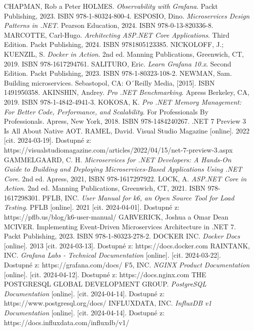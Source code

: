 \documentclass[a4paper,12pt]{article}
\begin{document}
{CHAPMAN, Rob a Peter HOLMES. \emph{Observability with Grafana}. Packt Publishing, 2023. ISBN 978-1-80324-800-4.
ESPOSIO, Dino. \emph{Microservices Design Patterns in .NET}. Pearson Education, 2024. ISBN 978-0-13-820336-8.
MARCOTTE, Carl-Hugo. \emph{Architecting ASP.NET Core Applications}. Third Edition. Packt Publishing, 2024. ISBN 9781805123385.
NICKOLOFF, J.; KUENZIL, S. \emph{Docker in Action}. 2nd ed. Manning Publications, Greenwich, CT, 2019. ISBN 978-1617294761.
SALITURO, Eric. \emph{Learn Grafana 10.x}. Second Edition. Packt Publishing, 2023. ISBN 978-1-80323-108-2.
NEWMAN, Sam. Building microservices. Sebastopol, CA: O´Reilly Media, [2015]. ISBN 1491950358.
AKINSHIN, Andrey. \emph{Pro .NET Benchmarking}. Apress Berkeley, CA, 2019. ISBN 978-1-4842-4941-3.
KOKOSA, K. \emph{Pro .NET Memory Management: For Better Code, Performance, and Scalability}. For Professionals By Professionals. Apress, New York, 2018. ISBN 978-1484240267.
.NET 7 Preview 3 Is All About Native AOT. RAMEL, David. Visual Studio Magazine [online]. 2022 [cit. 2024-03-19]. Dostupné z: https://visualstudiomagazine.com/articles/2022/04/15/net-7-preview-3.aspx
GAMMELGAARD, C. H. \emph{Microservices for .NET Developers: A Hands-On Guide to Building and Deploying Microservices-Based Applications Using .NET Core}. 2nd ed. Apress, 2021, ISBN 978-1617297922.
LOCK, A. \emph{ASP.NET Core in Action}. 2nd ed. Manning Publications, Greenwich, CT, 2021. ISBN 978-1617298301.
PFLB, INC. \emph{User Manual for k6, an Open Source Tool for Load Testing}. PFLB [online]. 2021 [cit. 2024-04-01]. Dostupné z: https://pflb.us/blog/k6-user-manual/
GARVERICK, Joshua a Omar Dean MCIVER. Implementing Event-Driven Microservices Architecture in .NET 7. Packt Publishing, 2023. ISBN 978-1-80323-278-2.
DOCKER INC. \emph{Docker Docs} [online]. 2013 [cit. 2024-03-13]. Dostupné z: https://docs.docker.com
RAINTANK, INC. \emph{Grafana Labs - Technical Documentation} [online]. [cit. 2024-03-22]. Dostupné z: https://grafana.com/docs/
 F5, INC. \emph{NGINX Product Documentation} [online]. [cit. 2024-04-12]. Dostupné z: https://docs.nginx.com
THE POSTGRESQL GLOBAL DEVELOPMENT GROUP. \emph{PostgreSQL Documentation} [online]. [cit. 2024-04-14]. Dostupné z: https://www.postgresql.org/docs/
INFLUXDATA, INC. \emph{InfluxDB v1 Documentation} [online]. [cit. 2024-04-14]. Dostupné z: https://docs.influxdata.com/influxdb/v1/
}
\end{document}
